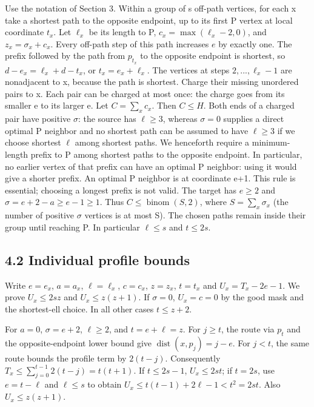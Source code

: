 \documentclass[
  11pt,
]{article}
\begin{document}
Use the notation of Section 3. Within a group of s off-path vertices,
for each x take a shortest path to the opposite endpoint, up to its
first P vertex at local coordinate \(t_{x}\). Let \(\ell _{x}\) be its
length to P, \(c_{x}=\operatorname{max}(\ell _{x}-2,0)\), and
\(z_{x}=\sigma _{x}+c_{x}\). Every off-path step of this path increases
\(e\) by exactly one. The prefix followed by the path from \(p_{t_x}\)
to the opposite endpoint is shortest, so \(d-e_x=\ell_x+d-t_x\), or
\(t_x=e_x+\ell_x\). The vertices at steps \(2,...,\ell _{x}-1\) are
nonadjacent to x, because the path is shortest. Charge their missing
unordered pairs to x. Each pair can be charged at most once: the charge
goes from its smaller e to its larger e. Let \(C=\sum_x c_x\). Then
\(C\le H\). Both ends of a charged pair have positive \(\sigma\): the
source has \(\ell \ge 3\), whereas \(\sigma =0\) supplies a direct
optimal P neighbor and no shortest path can be assumed to have
\(\ell \ge 3\) if we choose shortest \(\ell\) among shortest paths. We
henceforth require a minimum-length prefix to P among shortest paths to
the opposite endpoint. In particular, no earlier vertex of that prefix
can have an optimal P neighbor: using it would give a shorter prefix. An
optimal P neighbor is at coordinate e+1. This rule is essential;
choosing a longest prefix is not valid. The target has \(e\ge 2\) and
\(\sigma =e+2-a\ge e-1\ge 1\). Thus \(C\le \operatorname{binom}(S,2)\),
where \(S=\sum_x\sigma_x\) (the number of positive \(\sigma\) vertices
is at most S). The chosen paths remain inside their group until reaching
P. In particular \(\ell \le s\) and \(t\le 2s\).

\subsection{4.2 Individual profile
bounds}\label{individual-profile-bounds}

Write \(e=e_{x}\), \(a=a_{x}\), \(\ell =\ell _{x}\), \(c=c_{x}\),
\(z=z_{x}\), \(t=t_{x}\) and \(U_{x}=T_{x}-2e-1\). We prove
\(U_{x}\le 2sz\) and \(U_{x}\le z(z+1)\). If \(\sigma =0\),
\(U_{x}=c=0\) by the good mask and the shortest-ell choice. In all other
cases \(t\le z+2\).

For \(a=0\), \(\sigma =e+2\), \(\ell \ge 2\), and \(t=e+\ell =z\). For
\(j\ge t\), the route via \(p_t\) and the opposite-endpoint lower bound
give \(\operatorname{dist}(x,p_j)=j-e\). For \(j<t\), the same route
bounds the profile term by \(2(t-j)\). Consequently
\(T_x\le\sum_{j=0}^{t-1}2(t-j)=t(t+1)\). If \(t\le 2s-1\),
\(U_{x}\le 2st\); if \(t=2s\), use \(e=t-\ell\) and \(\ell \le s\) to
obtain \(U_{x}\le t(t-1)+2\ell -1<t^2=2st\). Also \(U_{x}\le z(z+1)\).
\end{document}
